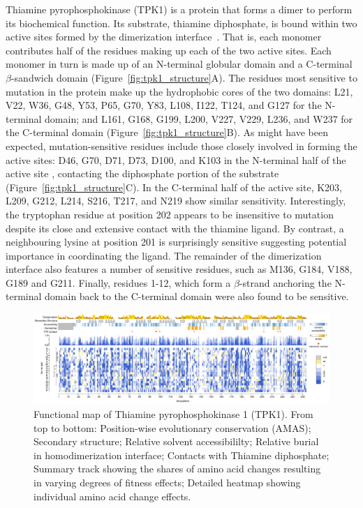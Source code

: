 Thiamine pyrophosphokinase (TPK1) is a protein that forms a dimer to perform its biochemical function. Its substrate, thiamine diphosphate, is bound within two active sites formed by the dimerization interface~\cite{timm_crystal_2001}. That is, each monomer contributes half of the residues making up each of the two active sites.  Each monomer in turn is made up of an N-terminal globular domain and a C-terminal $\beta$-sandwich domain (Figure~\ref{fig:tpk1_structure}A). The residues most sensitive to mutation in the protein make up the hydrophobic cores of the two domains: L21, V22, W36, G48, Y53, P65, G70, Y83, L108, I122, T124, and G127 for the N-terminal domain; and L161, G168, G199, L200, V227, V229, L236, and W237 for the C-terminal domain (Figure~\ref{fig:tpk1_structure}B). As might have been expected, mutation-sensitive residues include those closely involved in forming the active sites: D46, G70, D71, D73, D100, and K103 in the N-terminal half of the active site , contacting the diphosphate portion of the substrate (Figure~\ref{fig:tpk1_structure}C). In the C-terminal half of the active site, K203, L209, G212, L214, S216, T217, and N219 show similar sensitivity. Interestingly, the tryptophan residue at position 202 appears to be insensitive to mutation despite its close and extensive contact with the thiamine ligand. By contrast, a neighbouring lysine at position 201 is surprisingly sensitive suggesting potential importance in coordinating the ligand.  The remainder of the dimerization interface also features a number of sensitive residues, such as M136, G184, V188, G189 and G211. Finally, residues 1-12, which form a $\beta$-strand anchoring the N-terminal domain back to the C-terminal domain were also found to be sensitive.

\begin{landscape}
\begin{figure}[h!]
	\centering
	\includegraphics[width=9in]{img/tpk1-map.pdf}
	\caption{Functional map of Thiamine pyrophosphokinase 1 (TPK1). From top to bottom: Position-wise evolutionary conservation (AMAS); Secondary structure; Relative solvent accessibililty; Relative burial in homodimerization interface; Contacts with Thiamine diphosphate; Summary track showing the shares of amino acid changes resulting in varying degrees of fitness effects; Detailed heatmap showing individual amino acid change effects.}
	\label{fig:tpk1-map}
\end{figure}
\end{landscape}

